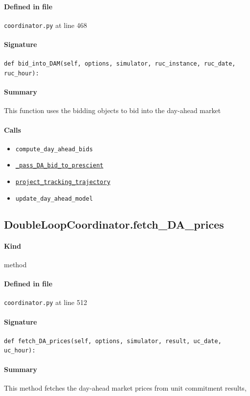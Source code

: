\documentclass[11pt]{report}
\begin{document}
\paragraph{Defined in file} \texttt{coordinator.py} at line 468
\paragraph{Signature} \texttt{def bid\_into\_DAM(self, options, simulator, ruc\_instance, ruc\_date, ruc\_hour):}
\paragraph{Summary} This function uses the bidding objects to bid into the day-ahead market
\paragraph{Calls}
\begin{itemize}[leftmargin=*]
  \item \texttt{compute\_day\_ahead\_bids}
  \item \hyperref[def:coordinator.py:DoubleLoopCoordinator._pass_DA_bid_to_prescient:L272]{\texttt{\_pass\_DA\_bid\_to\_prescient}}
  \item \hyperref[def:coordinator.py:DoubleLoopCoordinator.project_tracking_trajectory:L321]{\texttt{project\_tracking\_trajectory}}
  \item \texttt{update\_day\_ahead\_model}
\end{itemize}
\subsection{DoubleLoopCoordinator.fetch\_DA\_prices}
\label{def:coordinator.py:DoubleLoopCoordinator.fetch_DA_prices:L512}
\paragraph{Kind} method
\paragraph{Defined in file} \texttt{coordinator.py} at line 512
\paragraph{Signature} \texttt{def fetch\_DA\_prices(self, options, simulator, result, uc\_date, uc\_hour):}
\paragraph{Summary} This method fetches the day-ahead market prices from unit commitment results,
\end{document}
